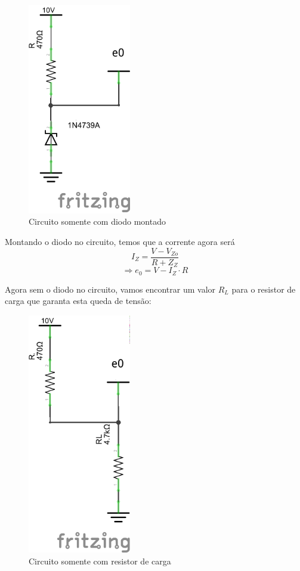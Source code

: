 \documentclass[12pt, a4paper, twoside]{article}
\begin{document}
\begin{figure}[H]
    \centering
    \includegraphics[width=0.4\textwidth]{figs/rel4/ex4-1.png}
    \caption{Circuito somente com diodo montado}
\end{figure}

Montando o diodo no circuito, temos que a corrente agora será
$$ I_Z = \frac{V-V_{Zo}}{R+Z_Z} $$
$$ \Rightarrow e_0 = V - I_Z \cdot R $$

Agora sem o diodo no circuito, vamos encontrar um valor $R_L$ para o resistor de carga que garanta esta queda de tensão:

\begin{figure}[H]
    \centering
    \includegraphics[width=0.4\textwidth]{figs/rel4/ex4-2.png}
    \caption{Circuito somente com resistor de carga}
\end{figure}
\end{document}
